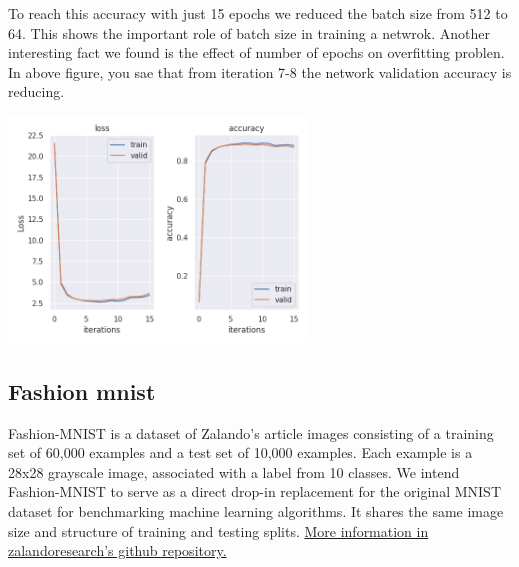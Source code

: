 \documentclass[10pt]{SelfArx} %
\begin{document}
To reach this accuracy with just 15 epochs we reduced the batch size from 512 to 64. This shows the important role of batch size in training a netwrok. Another interesting fact we found is the effect of number of epochs on overfitting problen. In above figure, you sae that from iteration 7-8 the network validation accuracy is reducing.

\begin{center}
	\includegraphics[width=1\linewidth,height=6cm]{img/mnist-plots2}
	\label{fmnist2}
\end{center}


\subsection{Fashion mnist}
Fashion-MNIST is a dataset of Zalando's article images consisting of a training set of 60,000 examples and a test set of 10,000 examples. Each example is a 28x28 grayscale image, associated with a label from 10 classes. We intend Fashion-MNIST to serve as a direct drop-in replacement for the original MNIST dataset for benchmarking machine learning algorithms. It shares the same image size and structure of training and testing splits. \href{https://github.com/zalandoresearch/fashion-mnist}{More information in zalandoresearch's github repository.}
\end{document}
